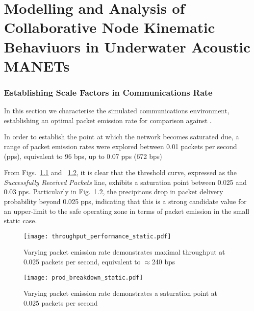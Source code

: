 \def\ChapterTitle{Modelling and Analysis of Collaborative Node Kinematic Behaviuors in Underwater Acoustic MANETs}

\ifx\ifthesis\undefined

\else
\chapter{\ChapterTitle}
\label{Chapter\thechapter}
\fi



\subsection{Establishing Scale Factors in Communications Rate}

In this section we characterise the simulated communications environment, establishing an optimal packet emission rate for comparison against \cite{Guo11}.

In order to establish the point at which the network becomes saturated due, a range of packet emission rates were explored between 0.01 packets per second (pps), equivalent to 96 bps, up to 0.07 pps (672 bps)

From Figs.~\ref{fig:throughput_performance_static} and ~\ref{fig:prod_breakdown_static}, it is clear that the threshold curve, expressed as the \emph{Successfully Received Packets} line, exhibits a saturation point between 0.025 and 0.03 pps.
Particularly in Fig.~\ref{fig:prod_breakdown_static}, the precipitous drop in packet delivery probability beyond 0.025 pps, indicating that this is a strong candidate value for an upper-limit to the safe operating zone in terms of packet emission in the small static case.

\begin{figure}[H]
  \centering
  \texttt{[image: throughput\_performance\_static.pdf]}
  \caption{Varying packet emission rate demonstrates maximal throughput at 0.025 packets per second, equivalent to $\approx$240 bps}
  \label{fig:throughput_performance_static}
\end{figure}


\begin{figure}[H]
  \centering
  \texttt{[image: prod\_breakdown\_static.pdf]}
  \caption{Varying packet emission rate demonstrates a saturation point at 0.025 packets per second}
  \label{fig:prod_breakdown_static}
\end{figure}

